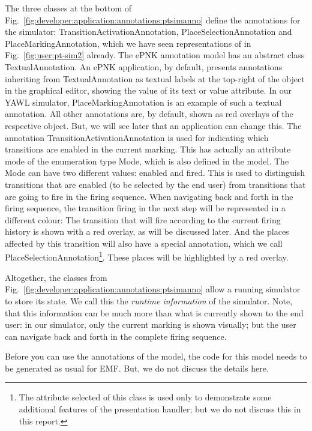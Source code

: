 The three classes at the bottom of
Fig.~\ref{fig:developer:application:annotations:ptsimanno} define the annotations
for the simulator: {\sf TransitionActivationAnnotation}, {\sf PlaceSelectionAnnotation} and
{\sf PlaceMarkingAnnotation}, which we have seen representations of in Fig.~\ref{fig:user:pt-sim2} already.
The ePNK annotation model has an abstract class {\sf TextualAnnotation}.
An ePNK application, by default, presents annotations inheriting from
{\sf TextualAnnotation} as textual labels at the top-right of the object
in the graphical editor, showing the value of its {\sf text} or {\sf value} attribute.
In our YAWL simulator, {\sf PlaceMarkingAnnotation} is an example of such a textual annotation.
All other  annotations are, by default, shown as red overlays of the respective
object. But, we will see later that an application can change this.
%
The annotation {\sf TransitionActivationAnnotation} is used for indicating which
transitions are enabled in the current marking. This has actually an attribute {\sf mode}
of the enumeration type {\sf Mode}, which is also defined in the model. The {\sf Mode}
can have two different values:  {\sf enabled} and {\sf fired}. This is used
to distinguish transitions that are enabled (to be selected by the end user)
from transitions that are going to fire in the firing sequence. When navigating
back and forth in the firing sequence, the transition firing in the next step
will be represented in a different colour: The
transition that will fire according to the current firing history is
shown with a red overlay, as will be discussed later. And the places affected by this
transition will also have a special annotation, which we call {\sf PlaceSelectionAnnotation}\footnote
  {The attribute {\sf selected} of this class is used only to demonstrate some additional features of the
   presentation handler; but we do not discuss this in this report.}.
These places will be highlighted by a red overlay.

Altogether, the classes from Fig.~\ref{fig:developer:application:annotations:ptsimanno}
allow a running simulator to store its {\sf state}.
We call this
the \emph{runtime information} of the simulator. Note, that this information can be
much more than what is currently shown to the end user: in our simulator, only
the current marking is shown visually; but the user can navigate back and forth
in the complete firing sequence.

Before you can use the annotations of the model, the code for this
model needs to be generated as usual for EMF. But, we do not discuss the
details here.

